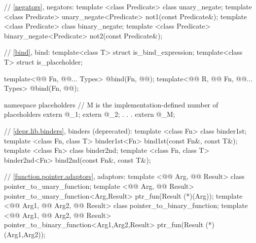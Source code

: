 \documentclass[american,twoside]{book}
\begin{document}
\begin{codeblock}
{  // \ref{negators}, negators:
  template <class Predicate> class unary_negate;
  template <class Predicate>
    unary_negate<Predicate>  not1(const Predicate&);
  template <class Predicate> class binary_negate;
  template <class Predicate>
    binary_negate<Predicate> not2(const Predicate&);

  // \ref{bind}, bind:
  template<class T> struct is_bind_expression;
  template<class T> struct is_placeholder;

  template<@@ Fn, @@... Types>
    @\unspec@ bind(Fn, @@);
  template<@@ R, @@ Fn, @@... Types>
    @\unspec@ bind(Fn, @@);

  namespace placeholders {
    // M is the implementation-defined number of placeholders
    extern @\unspec@ _1;
    extern @\unspec@ _2;
                .
                .
                .
    extern @\unspec@ _M;
  }  

  // \ref{depr.lib.binders}, binders (deprecated):
  template <class Fn> class binder1st;
  template <class Fn, class T>
    binder1st<Fn> bind1st(const Fn&, const T&);
  template <class Fn> class binder2nd;
  template <class Fn, class T>
    binder2nd<Fn> bind2nd(const Fn&, const T&);

  // \ref{function.pointer.adaptors}, adaptors:
  template <@@ Arg, @@ Result> 
    class pointer_to_unary_function;
  template <@@ Arg, @@ Result>
    pointer_to_unary_function<Arg,Result> ptr_fun(Result (*)(Arg));
  template <@@ Arg1, @@ Arg2, @@ Result>
    class pointer_to_binary_function;
  template <@@ Arg1, @@ Arg2, @@ Result>
    pointer_to_binary_function<Arg1,Arg2,Result>
      ptr_fun(Result (*)(Arg1,Arg2));

}
\end{codeblock}
\end{document}
